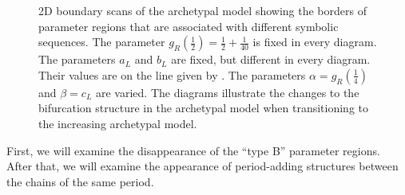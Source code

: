 \begin{figure}
{		\label{fig:add.change.regions.3}
	}
	\caption[Changes to the bifurcation structures of the archetypal model during its transition to the increasing archetypal model]{
		2D boundary scans of the archetypal model showing the borders of parameter regions that are associated with different symbolic sequences.
		The parameter $g_R\left(\frac{1}{2}\right) = \frac{1}{2} + \frac{1}{40}$ is fixed in every diagram.
		The parameters $a_L$ and $b_L$ are fixed, but different in every diagram.
		Their values are on the line given by .
		The parameters $\alpha = g_R\left(\frac{1}{4}\right)$ and $\beta = c_L$ are varied.
		The diagrams illustrate the changes to the bifurcation structure in the archetypal model when transitioning to the increasing archetypal model.
	}
	\label{fig:add.change.regions}
\end{figure}

First, we will examine the disappearance of the ``type B'' parameter regions.
After that, we will examine the appearance of period-adding structures between the chains of the same period.




